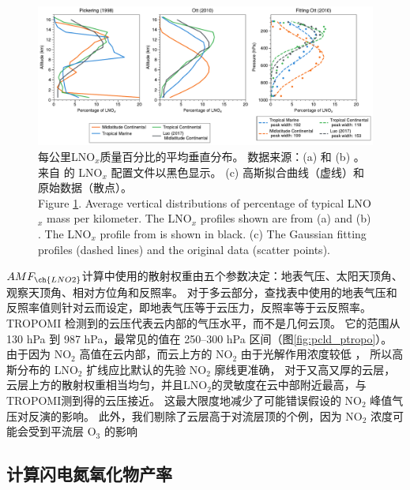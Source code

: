 \begin{figure}[ht]
\centering
\includegraphics[width=16cm]{./figures/arctic_lnox_profile.pdf}
\caption{
每公里LNO$_x$质量百分比的平均垂直分布。
数据来源：(a) \citet{Pickering.1998} 和 (b) \citet{Ott.2010}。
来自 \citet{Luo.2017} 的 LNO$_x$ 配置文件以黑色显示。
(c) 高斯拟合曲线（虚线）和原始数据（散点）。\\
Figure \ref{fig:arctic_lnox_profile}.
Average vertical distributions of percentage of typical LNO$_x$ mass per kilometer.
The LNO$_x$ profiles shown are from (a) \citet{Pickering.1998} and (b) \citet{Ott.2010}.
The LNO$_x$ profile from \citet{Luo.2017} is shown in black.
(c) The Gaussian fitting profiles (dashed lines) and the original data (scatter points).
}
\label{fig:arctic_lnox_profile}
\end{figure}

$AMF_{\ch{LNO2}}$计算中使用的散射权重由五个参数决定：地表气压、太阳天顶角、观察天顶角、相对方位角和反照率。
对于多云部分，查找表中使用的地表气压和反照率值则针对云而设定，即地表气压等于云压力，反照率等于云反照率。
TROPOMI 检测到的云压代表云内部的气压水平，而不是几何云顶\citep{Vasilkov.2008,Joiner.2012}。
它的范围从 130 hPa 到 987 hPa，最常见的值在 250--300 hPa 区间（图\ref{fig:pcld_ptropo}）。
由于因为 NO$_2$ 高值在云内部，而云上方的 NO$_2$ 由于光解作用浓度较低 \citep{Beirle.2009}，
所以高斯分布的 LNO$_2$ 扩线应比默认的先验 NO$_2$ 廓线更准确，
对于又高又厚的云层，云层上方的散射权重相当均匀，并且LNO$_2$的灵敏度在云中部附近最高，与 TROPOMI测到得的云压接近\citep{Beirle.2009}。
这最大限度地减少了可能错误假设的 NO$_2$ 峰值气压对反演的影响\citep{Laughner.2017}。
此外，我们剔除了云层高于对流层顶的个例，因为 NO$_2$ 浓度可能会受到平流层 O$_3$ 的影响\citep{Frey.2015a,Zhang.2022a}


\subsection*{计算闪电氮氧化物产率} \label{sec:calc_lnox_pe}

